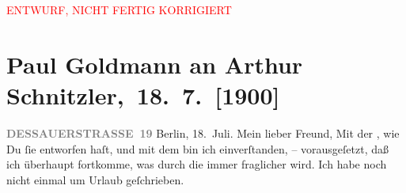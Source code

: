 
\begin{center}
            \textcolor{red}{ENTWURF, NICHT FERTIG KORRIGIERT}
                      \end{center}
            
         
         \newcommand{\erwaehntePersonen}{Personen: Robert Hirschfeld, Alfred Kerr}
         \newcommand{\erwaehnteInstitutionen}{Institutionen: Berliner Theater, Deutsches Schauspielhaus in Hamburg}
         \newcommand{\erwaehnteOrte}{Orte: Berlin, China, Dessauer Straße, Innsbruck, Lago di Garda, Reichenau an der Rax, Riva del Garda}
         \newcommand{\erwaehnteWerke}{Werke: Der Schleier der Beatrice. Schauspiel in fünf Akten}
               \section[ Paul Goldmann an Arthur Schnitzler, 18. 7. {[}1900{]}]{ Paul Goldmann an Arthur Schnitzler, 18. 7. {[}1900{]}}\nopagebreak{}\rehead{ }\begin{ledgroupsized}[t]{13cm}\normalsize\beginnumbering \toendnotes[C]{\smallbreak\pagebreak[2]} 
\toendnotes[C]{\smallbreak}\pstart{}{\pb}\textcolor{gray}{\textbf{DESSAUERSTRASSE 19}}\pend{}{\bigskip}\pstart
           Berlin, 18. Juli.\pend
           \pstart\center{}Mein lieber Freund,\pend\pstart
           Mit der \label{K_L02924-1v}\label{K_L02924-1h}, wie Du ſie entworfen haſt, und mit dem \label{K_L02924-2v}\label{K_L02924-2h} bin ich einverſtanden, – vorausgeſetzt, daß ich überhaupt fortkomme, was
               durch die \label{K_L02924-3v}\label{K_L02924-3h} immer fraglicher wird. Ich habe noch nicht einmal um Urlaub geſchrieben.

\end{ledgroupsized}
